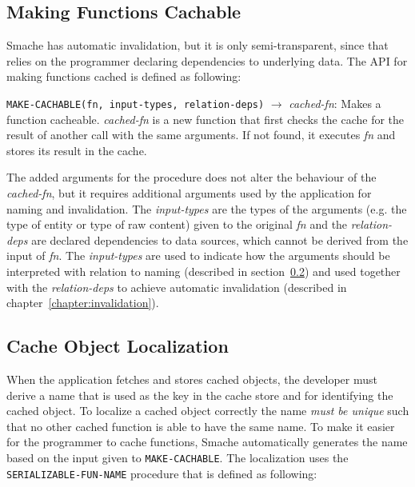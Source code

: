 
\subsection{Making Functions Cachable}
\label{subsec:making-functions-cachable}

Smache has automatic invalidation, but it is only semi-transparent, since that relies on the programmer declaring dependencies to underlying data. The API for making functions cached is defined as following:

\verb$MAKE-CACHABLE(fn, input-types, relation-deps)$ $\rightarrow$ \emph{cached-fn}: Makes a function cacheable. \emph{cached-fn} is a new function that first checks the cache for the result of another call with the same arguments. If not found, it executes \emph{fn} and stores its result in the cache.

The added arguments for the procedure does not alter the behaviour of the \emph{cached-fn}, but it requires additional arguments used by the application for naming and invalidation. The \emph{input-types} are the types of the arguments (e.g. the type of entity or type of raw content) given to the original \emph{fn} and the \emph{relation-deps} are declared dependencies to data sources, which cannot be derived from the input of \emph{fn}. The \emph{input-types} are used to indicate how the arguments should be interpreted with relation to naming (described in section~\ref{subsec:cache-object-localization}) and used together with the \emph{relation-deps} to achieve automatic invalidation (described in chapter~\ref{chapter:invalidation}).


\subsection{Cache Object Localization}
\label{subsec:cache-object-localization}

When the application fetches and stores cached objects, the developer must derive a name that is used as the key in the cache store and for identifying the cached object. To localize a cached object correctly the name \emph{must be unique} such that no other cached function is able to have the same name. To make it easier for the programmer to cache functions, Smache automatically generates the name based on the input given to \verb$MAKE-CACHABLE$. The localization uses the \verb$SERIALIZABLE-FUN-NAME$ procedure that is defined as following:

